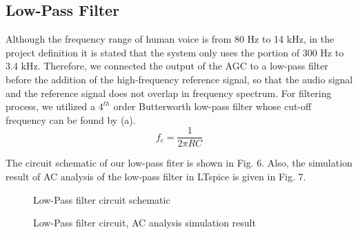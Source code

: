 \documentclass[conference]{IEEEtran}
\begin{document}
\subsection{Low-Pass Filter}
Although the frequency range of human voice is from 80 Hz to 14 kHz, in the project definition it is stated that the system only uses the portion of 300 Hz to 3.4 kHz. Therefore, we connected the output of the AGC to a low-pass filter before the addition of the high-frequency reference signal, so that the audio signal and the reference signal does not overlap in frequency spectrum. For filtering process, we utilized a \(4^{th}\) order Butterworth low-pass filter whose cut-off frequency can be found by (a). 
\begin{equation}\label{eq:a}
f_c = \frac{1}{2\pi RC}
\end{equation}  
\par The circuit schematic of our low-pass fiter is shown in Fig. 6.  Also, the simulation result of AC analysis of the low-pass filter in LTspice is given in Fig. 7.
 \begin{figure}[H]
   \centerline{}
    \caption{Low-Pass filter circuit schematic}
\end{figure}
 \begin{figure}[H]
   \centerline{}
    \caption{Low-Pass filter circuit, AC analysis simulation result}
\end{figure} 
\end{document}
